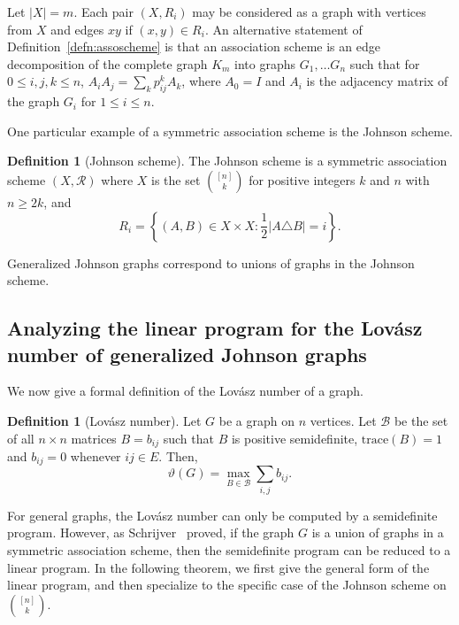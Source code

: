 \documentclass[11pt]{article}
\theoremstyle{definition}
\newtheorem{definition}[theorem]{Definition}
\theoremstyle{remark}
\newcommand{\cB}{\mathcal{B}}
\begin{document}
Let $|X| = m$. Each pair $(X, R_i)$ may be considered as a graph with vertices from $X$ and edges $xy$ if $(x, y) \in R_i$. An alternative statement of Definition~\ref{defn:assoscheme} is that an association scheme is an edge decomposition of the complete graph $K_m$ into graphs $G_1, \ldots G_n$ such that for $0 \le i, j, k\le n$,  $A_iA_j =  \sum_k p_{ij}^kA_k$, where $A_0 = I$ and $A_i$ is the adjacency matrix of the graph $G_i$ for $1\le i\le n$. 

One particular example of a symmetric association scheme is the Johnson scheme. 

\begin{definition}[Johnson scheme]
The Johnson scheme is a symmetric association scheme $(X, \mathcal{R})$ where $X$ is the set $\binom{[n]}{k}$ for positive integers $k$ and $n$ with $n\ge 2k$, and 
\[R_i = \left\{(A, B) \in X\times X: \frac12|A\triangle B| = i\right\}.\] 

\end{definition}

Generalized Johnson graphs correspond to unions of graphs in the Johnson scheme. 

\subsection{Analyzing the linear program for the Lov\'asz number of generalized Johnson graphs}

We now give a formal definition of the Lov\'asz number of a graph. 

\begin{definition}[Lov\'asz number]\label{defn:lovasznumbergen}
Let $G$ be a graph on $n$ vertices. Let $\cB$ be the set of all $n\times n$ matrices $B = b_{ij}$ such that $B$ is positive semidefinite, $\text{trace}(B) = 1$ and $b_{ij} = 0$ whenever $ij \in E$. Then, 
\[\vartheta(G) = \max_{B\in \cB}\sum_{i, j}b_{ij}.\]

\end{definition}

For general graphs, the Lov\'asz number can only be computed by a semidefinite program. However, as Schrijver~\cite[Theorem 4]{Sch1979} proved, if the graph $G$ is a union of graphs in a symmetric association scheme, then the semidefinite program can be reduced to a linear program. In the following theorem, we first give the general form of the linear program, and then specialize to the specific case of the Johnson scheme on $\binom{[n]}{k}$. 
\end{document}
